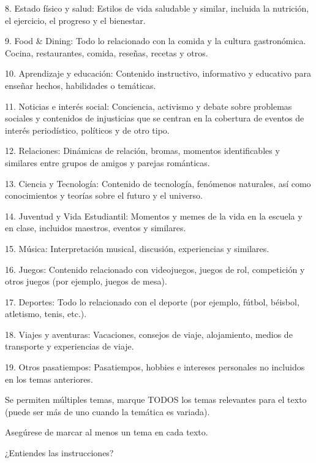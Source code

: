 8. Estado físico y salud: Estilos de vida saludable y similar, incluida la nutrición, el ejercicio, el progreso y el bienestar.

9. Food \& Dining: Todo lo relacionado con la comida y la cultura gastronómica. Cocina, restaurantes, comida, reseñas, recetas y otros.

10. Aprendizaje y educación: Contenido instructivo, informativo y educativo para enseñar hechos, habilidades o temáticas.

11. Noticias e interés social: Conciencia, activismo y debate sobre problemas sociales y contenidos de injusticias que se centran en la cobertura de eventos de interés periodístico, políticos y de otro tipo.

12. Relaciones: Dinámicas de relación, bromas, momentos identificables y similares entre grupos de amigos y parejas románticas.

13. Ciencia y Tecnología: Contenido de tecnología, fenómenos naturales, así como conocimientos y teorías sobre el futuro y el universo.

14. Juventud y Vida Estudiantil: Momentos y memes de la vida en la escuela y en clase, incluidos maestros, eventos y similares.

15. Música: Interpretación musical, discusión, experiencias y similares.

16. Juegos: Contenido relacionado con videojuegos, juegos de rol, competición y otros juegos (por ejemplo, juegos de mesa).

17. Deportes: Todo lo relacionado con el deporte (por ejemplo, fútbol, béisbol, atletismo, tenis, etc.).

18. Viajes y aventuras: Vacaciones, consejos de viaje, alojamiento, medios de transporte y experiencias de viaje.

19. Otros pasatiempos: Pasatiempos, hobbies e intereses personales no incluidos en los temas anteriores.

Se permiten múltiples temas, marque TODOS los temas relevantes para el texto (puede ser más de uno cuando la temática es variada).

Asegúrese de marcar al menos un tema en cada texto.
 
¿Entiendes las instrucciones?

